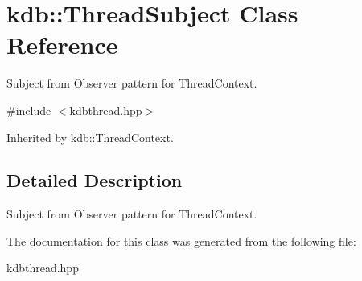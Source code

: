 \hypertarget{classkdb_1_1ThreadSubject}{\section{kdb\+:\+:Thread\+Subject Class Reference}
\label{classkdb_1_1ThreadSubject}
}


Subject from Observer pattern for Thread\+Context.  




{\ttfamily \#include $<$kdbthread.\+hpp$>$}



Inherited by kdb\+::\+Thread\+Context.



\subsection{Detailed Description}
Subject from Observer pattern for Thread\+Context. 

The documentation for this class was generated from the following file\+:\begin{DoxyCompactItemize}
\item 
kdbthread.\+hpp\end{DoxyCompactItemize}
